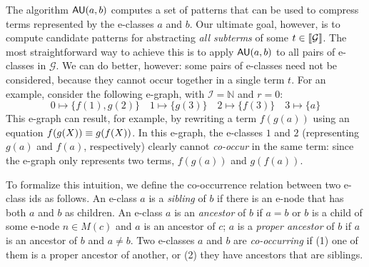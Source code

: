

%
The algorithm $\mathsf{AU}(a,b)$ computes a set of patterns that can be used to compress terms
represented by the e-classes $a$ and $b$.
%
Our ultimate goal, however, is to compute candidate patterns for abstracting
\emph{all subterms} of some $t \in \llbracket \mathcal{G} \rrbracket$.
%
The most straightforward way to achieve this is to apply $\mathsf{AU}(a,b)$ to all pairs of e-classes in $\mathcal{G}$.
%
We can do better, however:
some pairs of e-classes need not be considered,
because they cannot occur together in a single term $t$.
%
For an example, consider the following e-graph, with $\mathcal{I} = \mathbb{N}$ and $r = 0$:
$$
0 \mapsto \{f(1),g(2)\}\quad 1\mapsto\{g(3)\} \quad 2\mapsto \{f(3)\} \quad 3\mapsto \{a\}
$$
This e-graph can result, for example, by rewriting a term $f(g(a))$
using an equation $f(g(X)) \equiv g(f(X))$.
%
In this e-graph, the e-classes $1$ and $2$ (representing $g(a)$ and $f(a)$, respectively)
clearly cannot \emph{co-occur} in the same term:
since the e-graph only represents two terms, $f(g(a))$ and $g(f(a))$.

To formalize this intuition, we define the co-occurrence relation between two e-class ids as follows.
%
An e-class $a$ is a \emph{sibling} of $b$ if there is an e-node that has both $a$ and $b$ as children.
%
An e-class $a$ is an \emph{ancestor} of $b$ if $a = b$ or $b$ is a child of some e-node $n \in M(c)$ and $a$ is an ancestor of $c$;
$a$ is a \emph{proper ancestor} of $b$ if $a$ is an ancestor of $b$ and $a \neq b$.
%
Two e-classes $a$ and $b$ are \emph{co-occurring} if
  (1) one of them is a proper ancestor of another, or
  (2) they have ancestors that are siblings.


